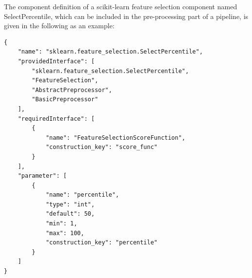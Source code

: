 The component definition of a scikit-learn feature selection component named SelectPercentile, which can be included in the pre-processing part of a pipeline, is given in the following as an example:
\begin{verbatim}
{
    "name": "sklearn.feature_selection.SelectPercentile",
    "providedInterface": [
        "sklearn.feature_selection.SelectPercentile",
        "FeatureSelection",
        "AbstractPreprocessor",
        "BasicPreprocessor"
    ],
    "requiredInterface": [
        {
            "name": "FeatureSelectionScoreFunction",
            "construction_key": "score_func"
        }
    ],
    "parameter": [
        {
            "name": "percentile",
            "type": "int",
            "default": 50,
            "min": 1,
            "max": 100,
            "construction_key": "percentile"
        }
    ]
}
\end{verbatim}
